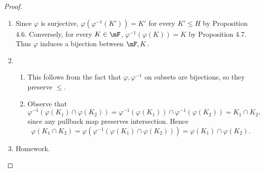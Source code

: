 \documentclass[pmath347]{subfiles}
\begin{document}
    \begin{proof}
        \begin{enumerate}
            \item Since $\varphi$ is surjective, $\varphi\left( \varphi^{-1} \left( K' \right)  \right) = K'$ for every $K'\leq H$ by Proposition 4.6. Conversely, for every $K\in\mF$, $\varphi^{-1} \left( \varphi\left( K \right)  \right) = K$ by Proposition 4.7. Thus $\varphi$ induces a bijection between $\mF,K$. \qqqedsym
            \item
                \begin{enumerate}
                    \item This follows from the fact that $\varphi,\varphi^{-1} $ on subsets are bijections, so they preserve $\leq$.
                    \item Observe that
                        \begin{equation*}
                            \varphi^{-1} \left( \varphi\left( K_1 \right) \cap\varphi\left( K_2 \right)  \right) = \varphi^{-1} \left( \varphi\left( K_1 \right)  \right) \cap \varphi^{-1} \left( \varphi\left( K_2 \right)  \right) = K_1\cap K_2,
                        \end{equation*}
                        since any pullback map preserves intersection. Hence
                        \begin{equation*}
                            \varphi\left( K_1\cap K_2 \right) = \varphi\left( \varphi^{-1} \left( \varphi\left( K_1 \right) \cap \varphi\left( K_2 \right)  \right)  \right) = \varphi\left( K_1 \right) \cap \varphi\left( K_2 \right) . 
                        \end{equation*}
                \end{enumerate}
            \item Homework. \qqedsym
        \end{enumerate}
    \end{proof}
\end{document}
